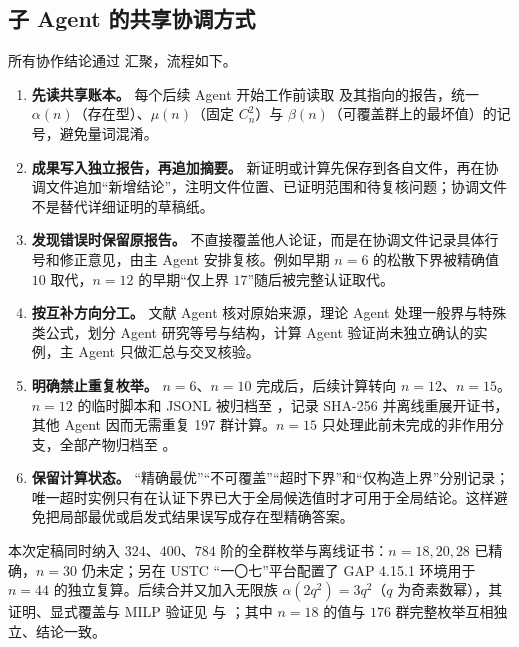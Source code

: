 \documentclass[11pt,a4paper]{article}
\numberwithin{equation}{section}
\theoremstyle{plain}
\theoremstyle{definition}
\theoremstyle{remark}
\begin{document}
\subsection{子 Agent 的共享协调方式}
所有协作结论通过  汇聚，流程如下。
\begin{enumerate}[label=\textup{(\arabic*)},leftmargin=2.6em]
 \item \textbf{先读共享账本。} 每个后续 Agent 开始工作前读取  及其指向的报告，统一 $\alpha(n)$（存在型）、$\mu(n)$（固定 $C_n^2$）与 $\beta(n)$（可覆盖群上的最坏值）的记号，避免量词混淆。
 \item \textbf{成果写入独立报告，再追加摘要。} 新证明或计算先保存到各自文件，再在协调文件追加“新增结论”，注明文件位置、已证明范围和待复核问题；协调文件不是替代详细证明的草稿纸。
 \item \textbf{发现错误时保留原报告。} 不直接覆盖他人论证，而是在协调文件记录具体行号和修正意见，由主 Agent 安排复核。例如早期 $n=6$ 的松散下界被精确值 $10$ 取代，$n=12$ 的早期“仅上界 $17$”随后被完整认证取代。
 \item \textbf{按互补方向分工。} 文献 Agent 核对原始来源，理论 Agent 处理一般界与特殊类公式，划分 Agent 研究等号与结构，计算 Agent 验证尚未独立确认的实例，主 Agent 只做汇总与交叉核验。
 \item \textbf{明确禁止重复枚举。} $n=6$、$n=10$ 完成后，后续计算转向 $n=12$、$n=15$。$n=12$ 的临时脚本和 JSONL 被归档至 ，记录 SHA-256 并离线重展开证书，其他 Agent 因而无需重复 197 群计算。$n=15$ 只处理此前未完成的非作用分支，全部产物归档至 。
 \item \textbf{保留计算状态。} “精确最优”“不可覆盖”“超时下界”和“仅构造上界”分别记录；唯一超时实例只有在认证下界已大于全局候选值时才可用于全局结论。这样避免把局部最优或启发式结果误写成存在型精确答案。
\end{enumerate}
本次定稿同时纳入 $324$、$400$、$784$ 阶的全群枚举与离线证书：$n=18,20,28$ 已精确，$n=30$ 仍未定；另在 USTC “一〇七”平台配置了 GAP 4.15.1 环境用于 $n=44$ 的独立复算。后续合并又加入无限族 $\alpha(2q^2)=3q^2$（$q$ 为奇素数幂），其证明、显式覆盖与 MILP 验证见  与 ；其中 $n=18$ 的值与 $176$ 群完整枚举互相独立、结论一致。

\appendix
\end{document}
